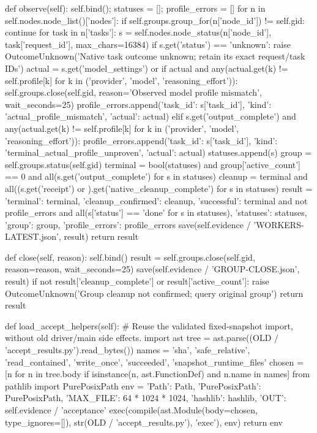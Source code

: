     def observe(self):
        self.bind(); statuses = []; profile_errors = []
        for n in self.nodes.node_list()['nodes']:
            if self.groups.group_for(n['node_id']) != self.gid:
                continue
            for task in n['tasks']:
                s = self.nodes.node_status(n['node_id'], task['request_id'], max_chars=16384)
                if s.get('status') == 'unknown':
                    raise OutcomeUnknown('Native task outcome unknown; retain its exact request/task IDs')
                actual = s.get('model_settings') or {}
                if actual and any(actual.get(k) != self.profile[k] for k in ('provider', 'model', 'reasoning_effort')):
                    self.groups.close(self.gid, reason='Observed model profile mismatch', wait_seconds=25)
                    profile_errors.append({'task_id': s['task_id'], 'kind': 'actual_profile_mismatch', 'actual': actual})
                elif s.get('output_complete') and any(actual.get(k) != self.profile[k] for k in ('provider', 'model', 'reasoning_effort')):
                    profile_errors.append({'task_id': s['task_id'], 'kind': 'terminal_actual_profile_unproven', 'actual': actual})
                statuses.append(s)
        group = self.groups.status(self.gid)
        terminal = bool(statuses) and group['active_count'] == 0 and all(s.get('output_complete') for s in statuses)
        cleanup = terminal and all((s.get('receipt') or {}).get('native_cleanup_complete') for s in statuses)
        result = {'terminal': terminal, 'cleanup_confirmed': cleanup,
                  'successful': terminal and not profile_errors and all(s['status'] == 'done' for s in statuses),
                  'statuses': statuses, 'group': group, 'profile_errors': profile_errors}
        save(self.evidence / 'WORKERS-LATEST.json', result)
        return result

    def close(self, reason):
        self.bind()
        result = self.groups.close(self.gid, reason=reason, wait_seconds=25)
        save(self.evidence / 'GROUP-CLOSE.json', result)
        if not result['cleanup_complete'] or result['active_count']:
            raise OutcomeUnknown('Group cleanup not confirmed; query original group')
        return result

    def load_accept_helpers(self):
        # Reuse the validated fixed-snapshot import, without old driver/main side effects.
        import ast
        tree = ast.parse((OLD / 'accept_results.py').read_bytes())
        names = {'sha', 'safe_relative', 'read_contained', 'write_once', 'succeeded', 'snapshot_runtime_files'}
        chosen = [n for n in tree.body if isinstance(n, ast.FunctionDef) and n.name in names]
        from pathlib import PurePosixPath
        env = {'Path': Path, 'PurePosixPath': PurePosixPath, 'MAX_FILE': 64 * 1024 * 1024,
               'hashlib': hashlib, 'OUT': self.evidence / 'acceptance'}
        exec(compile(ast.Module(body=chosen, type_ignores=[]), str(OLD / 'accept_results.py'), 'exec'), env)
        return env

